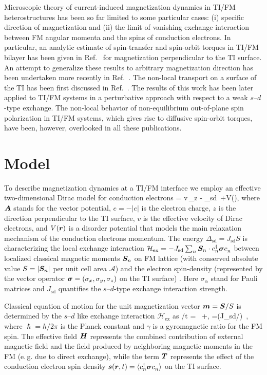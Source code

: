 Microscopic theory of current-induced magnetization dynamics in TI/FM heterostructures has been so far limited to some particular cases: (i) specific direction of magnetization and (ii) the limit of vanishing exchange interaction between FM angular momenta and the spins of conduction electrons.  In particular, an analytic estimate of spin-transfer and spin-orbit torques in TI/FM bilayer has been given in Ref.~\cite{sakai_spin_2014} for magnetization perpendicular to the TI surface. An attempt to generalize these results to arbitrary magnetization direction has been undertaken more recently in Ref.~\cite{ndiaye_dirac_2017}.  The non-local transport on a surface of the TI has been first discussed in Ref.~\cite{burkov_spin_2010-1}. The results of this work has been later applied to TI/FM systems \cite{taguchi_spin-charge_2015,shintani_spin_2016} in a perturbative approach with respect to a weak $s$--$d$-type exchange. The non-local behavior of non-equilibrium out-of-plane spin polarization in TI/FM systems, which gives rise to diffusive spin-orbit torques, have been, however, overlooked in all these publications. 

\section{Model}
To describe magnetization dynamics at a TI/FM interface we employ an effective two-dimensional Dirac model for conduction electrons 
\be
\label{TImodel}
= v\,_z - \Delta_\textrm{sd}\, \cdot \bb{\sigma} +V(),
\e
where $\boldsymbol{A}$ stands for the vector potential, $e=-|e|$ is the electron charge, $z$ is the direction perpendicular to the TI surface, $v$ is the effective velocity of Dirac electrons, and $V(\boldsymbol{r})$ is a disorder potential that models the main relaxation mechanism of the conduction electrons momentum. The energy $\Delta_{\textrm{sd}}=J_\textrm{sd} S$ is characterizing the local exchange interaction $\mathcal{H}_\textrm{ex}=-J_\textrm{sd} \sum_n  \bb{S}_n \cdot c\h_n \bb{\sigma}c\0_n$ between localized classical magnetic moments $\boldsymbol{S}_n$ on FM lattice (with conserved absolute value $S=|\boldsymbol{S}_n|$ per unit cell area $\mathcal{A}$) and the electron spin-density  (represented by the vector operator $\boldsymbol{\sigma} = (\sigma_x,\sigma_y,\sigma_z)$ on the TI surface) \cite{sdmodel}. Here $\sigma_\alpha$ stand for Pauli matrices and $J_\textrm{sd}$ quantifies the $s$--$d$-type exchange interaction strength.  

Classical equation of motion for the unit magnetization vector $\boldsymbol{m}=\boldsymbol{S}/S$ is determined by the $s$--$d$ like exchange interaction $\mathcal{H}_\textrm{ex}$ as
\be
\label{Eom}
\pa {}/\pa t = \gamma\,  \times{}+,\quad
{}=(J_\textrm{sd}/\hslash) \,\times{},
\e
where $\hslash=h/2\pi$ is the Planck constant and $\gamma$ is a gyromagnetic ratio for the FM spin. The effective field $\boldsymbol{H}$ represents the combined contribution of external magnetic field and the field produced by neighboring magnetic moments in the FM (e.\,g. due to direct exchange), while the term $\boldsymbol{T}$ represents the effect of the conduction electron spin density $\bb{s}(\bb{r},t)= \la c\h_n \bb{\sigma} c\0_n\ra$  on the TI surface. 

